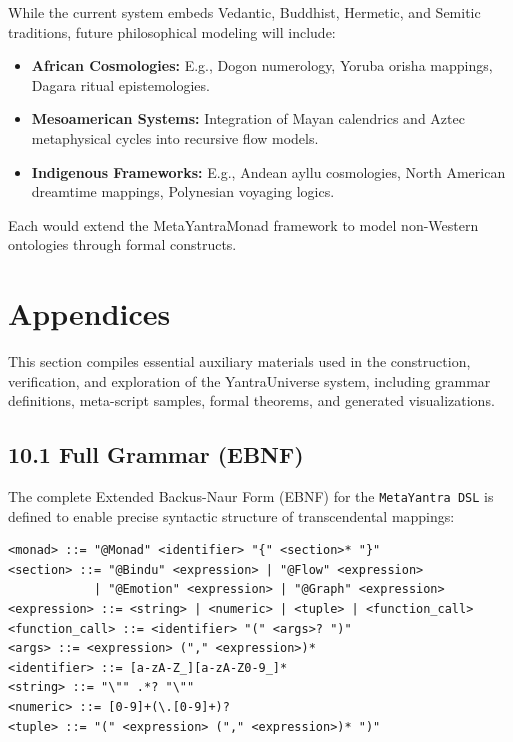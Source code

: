 \documentclass[12pt]{article}
\theoremstyle{plain}
\begin{document}
While the current system embeds Vedantic, Buddhist, Hermetic, and Semitic traditions, future philosophical modeling will include:

\begin{itemize}
  \item \textbf{African Cosmologies:} E.g., Dogon numerology, Yoruba orisha mappings, Dagara ritual epistemologies.
  \item \textbf{Mesoamerican Systems:} Integration of Mayan calendrics and Aztec metaphysical cycles into recursive flow models.
  \item \textbf{Indigenous Frameworks:} E.g., Andean ayllu cosmologies, North American dreamtime mappings, Polynesian voyaging logics.
\end{itemize}

Each would extend the MetaYantraMonad framework to model non-Western ontologies through formal constructs.


\nocite{*}



\section{Appendices}

This section compiles essential auxiliary materials used in the construction, verification, and exploration of the YantraUniverse system, including grammar definitions, meta-script samples, formal theorems, and generated visualizations.

\subsection{10.1 Full Grammar (EBNF)}

The complete Extended Backus-Naur Form (EBNF) for the \texttt{MetaYantra DSL} is defined to enable precise syntactic structure of transcendental mappings:

\begin{verbatim}
<monad> ::= "@Monad" <identifier> "{" <section>* "}"
<section> ::= "@Bindu" <expression> | "@Flow" <expression> 
            | "@Emotion" <expression> | "@Graph" <expression>
<expression> ::= <string> | <numeric> | <tuple> | <function_call>
<function_call> ::= <identifier> "(" <args>? ")"
<args> ::= <expression> ("," <expression>)*
<identifier> ::= [a-zA-Z_][a-zA-Z0-9_]*
<string> ::= "\"" .*? "\""
<numeric> ::= [0-9]+(\.[0-9]+)?
<tuple> ::= "(" <expression> ("," <expression>)* ")"
\end{verbatim}
\end{document}

